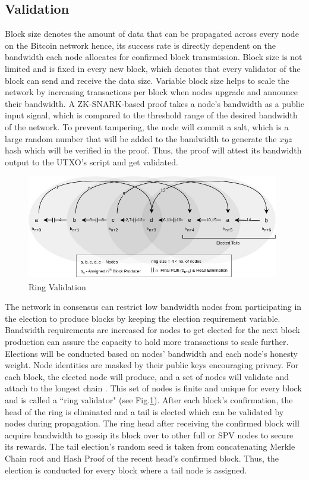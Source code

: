 \documentclass[a4paper,10pt]{article}
\begin{document}
\subsection{Validation}
Block size denotes the amount of data that can be propagated across every node on the Bitcoin network hence, its success rate is directly dependent on the bandwidth each node allocates for confirmed block transmission. Block size is not limited and is fixed in every new block, which denotes that every validator of the block can send and receive the data size. Variable block size helps to scale the network by increasing transactions per block when nodes upgrade and announce their bandwidth. A ZK-SNARK-based proof takes a node’s bandwidth as a public input signal, which is compared to the threshold range of the desired bandwidth of the network. To prevent tampering, the node will commit a salt, which is a large random number that will be added to the bandwidth to generate the $xyz$ hash which will be verified in the proof. Thus, the proof will attest its bandwidth output to the UTXO’s script and get validated. 
\begin{figure}[h]
\begin{center}
\includegraphics[width=11cm]{ring}
\caption{Ring Validation}
\label{ring}
\end{center}
\end{figure}
The network in consensus can restrict low bandwidth nodes from participating in the election to produce blocks by keeping the election requirement variable. Bandwidth requirements are increased for nodes to get elected for the next block production can assure the capacity to hold more transactions to scale further. Elections will be conducted based on nodes' bandwidth and each node's honesty weight. Node identities are masked by their public keys encouraging privacy. For each block, the elected node will produce, and a set of nodes will validate and attach to the longest chain \cite{nakamoto2008bitcoin}. This set of nodes is finite and unique for every block and is called a ``ring validator" (see Fig.\ref{ring}). After each block's confirmation, the head of the ring is eliminated and a tail is elected which can be validated by nodes during propagation. The ring head after receiving the confirmed block will acquire bandwidth to gossip its block over to other full or SPV nodes to secure its rewards. The tail election's random seed is taken from concatenating Merkle Chain root and Hash Proof \cite{yakovenko2018solana} of the recent head's confirmed block. Thus, the election is conducted for every block where a tail node is assigned.
\end{document}
